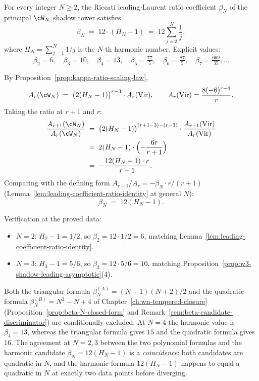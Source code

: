 \begin{conjecture}
\label{thm:beta-N-closed-form-proved-all-N}
\ClaimStatusConjectured
For every integer $N \ge 2$, the Riccati leading-Laurent ratio coefficient
$\beta_N$ of the principal $\cW_N$ shadow tower satisfies
\begin{equation}
\label{eq:beta-N-closed-form}
\beta_N
\;=\;
12 \cdot (H_N - 1)
\;=\;
12 \sum_{j = 2}^{N} \frac{1}{j},
\end{equation}
where $H_N = \sum_{j=1}^{N} 1/j$ is the $N$-th harmonic number. Explicit
values:
\[
 \beta_2 = 6,\quad \beta_3 = 10,\quad \beta_4 = 13,\quad
 \beta_5 = \tfrac{77}{5},\quad \beta_6 = \tfrac{87}{5},\quad
 \beta_7 = \tfrac{669}{35}, \ldots
\]
\end{conjecture}

\begin{remark}
By Proposition~\ref{prop:kappa-ratio-scaling-law},
\[
 A_r(\cW_N) \;=\; \bigl(2(H_N - 1)\bigr)^{r-3} \cdot A_r(\mathrm{Vir}),
 \qquad A_r(\mathrm{Vir}) = \frac{8 (-6)^{r-4}}{r}.
\]
Taking the ratio at $r+1$ and $r$:
\begin{align*}
 \frac{A_{r+1}(\cW_N)}{A_r(\cW_N)}
 &\;=\;
 \bigl(2(H_N - 1)\bigr)^{(r+1-3) - (r-3)}
 \cdot \frac{A_{r+1}(\mathrm{Vir})}{A_r(\mathrm{Vir})} \\
 &\;=\;
 2(H_N - 1) \cdot
 \Bigl( -\frac{6 r}{r + 1} \Bigr) \\
 &\;=\;
 -\frac{12 (H_N - 1) \cdot r}{r + 1}.
\end{align*}
Comparing with the defining form $A_{r+1}/A_r = -\beta_N \cdot r / (r + 1)$
(Lemma~\ref{lem:leading-coefficient-ratio-identity} at general $N$):
\[
 \beta_N \;=\; 12 (H_N - 1).
\]

Verification at the proved data:
\begin{itemize}[nosep]
\item $N = 2$: $H_2 - 1 = 1/2$, so $\beta_2 = 12 \cdot 1/2 = 6$,
 matching Lemma~\ref{lem:leading-coefficient-ratio-identity}.
\item $N = 3$: $H_3 - 1 = 5/6$, so $\beta_3 = 12 \cdot 5/6 = 10$,
 matching Proposition~\ref{prop:w3-shadow-leading-asymptotic}(4).
\end{itemize}
\end{remark}

\begin{corollary}
\label{cor:candidate-A-B-retracted}
\ClaimStatusConditional
Both the triangular formula $\beta_N^{(A)} = (N+1)(N+2)/2$ and the
quadratic formula $\beta_N^{(B)} = N^2 - N + 4$ of Chapter~\ref{ch:wn-tempered-closure}
(Proposition~\ref{prop:beta-N-closed-form} and
Remark~\ref{rem:beta-candidate-discriminator})
are conditionally excluded. At $N = 4$ the harmonic value is $\beta_4 = 13$, whereas
the triangular formula gives $15$ and the quadratic formula gives $16$.
The agreement at $N = 2, 3$ between the two polynomial formulas and
the harmonic candidate $\beta_N = 12(H_N-1)$
is a \emph{coincidence}: both candidates are quadratic in $N$, and the
harmonic formula $12(H_N - 1)$ happens to equal a quadratic in $N$ at exactly
two data points before diverging.
\end{corollary}

